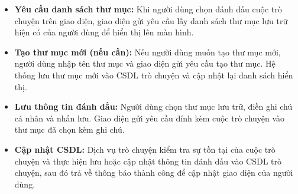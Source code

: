 \begin{itemize}

\item \textbf{Yêu cầu danh sách thư mục:}
Khi người dùng chọn đánh dấu
cuộc trò chuyện trên giao diện,
giao diện gửi yêu cầu lấy danh sách thư mục lưu trữ hiện có
của người dùng để hiển thị lên màn hình.

\item \textbf{Tạo thư mục mới (nếu cần):}
Nếu người dùng muốn tạo thư mục mới,
người dùng nhập tên thư mục
và giao diện gửi yêu cầu tạo thư mục.
Hệ thống lưu thư mục mới
vào CSDL trò chuyện
và cập nhật lại danh sách hiển thị.

\item \textbf{Lưu thông tin đánh dấu:}
Người dùng chọn thư mục lưu trữ,
điền ghi chú cá nhân và nhấn lưu.
Giao diện gửi yêu cầu đính kèm cuộc trò chuyện
vào thư mục đã chọn kèm ghi chú.

\item \textbf{Cập nhật CSDL:}
Dịch vụ trò chuyện kiểm tra sự tồn tại
của cuộc trò chuyện
và thực hiện lưu hoặc
cập nhật thông tin đánh dấu vào CSDL trò chuyện,
sau đó trả về thông báo thành công
để cập nhật giao diện của người dùng.

\end{itemize}
